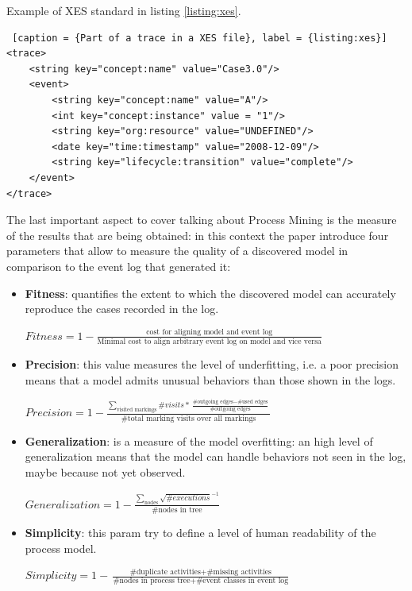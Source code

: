 Example of XES standard in listing \ref{listing:xes}.

\begin{lstlisting} [caption = {Part of a trace in a XES file}, label = {listing:xes}]
<trace>
    <string key="concept:name" value="Case3.0"/>
    <event>
        <string key="concept:name" value="A"/>
        <int key="concept:instance" value = "1"/>
        <string key="org:resource" value="UNDEFINED"/>
        <date key="time:timestamp" value="2008-12-09"/>
        <string key="lifecycle:transition" value="complete"/>
    </event>
</trace>
\end{lstlisting}


The last important aspect to cover talking about Process Mining is the measure of the results that are being obtained: in this 
context the paper \cite{DBLP:conf/ReplayQualityParameters} introduce four parameters that allow to measure the quality of a discovered 
model in comparison to the event log that generated it: 

\begin{itemize}
    \item \textbf{Fitness}: quantifies the extent to which the discovered model can accurately reproduce the cases recorded 
        in the log.

        \(Fitness = 1 - \frac{\textrm{cost for aligning model and event log}}{\textrm{Minimal cost to align arbitrary event log on model and vice versa}}\)

    \item \textbf{Precision}: this value measures the level of underfitting, i.e. a poor precision means that a model admits 
        unusual behaviors than those shown in the logs.

        \(Precision = 1 - \frac
            {\sum_{\textrm{visited markings}} \#visits * \frac{\textrm{\#outgoing edges} - \textrm{\#used edges}}{\textrm{\#outgoing edges}}}
            {\textrm{\#total marking visits over all markings}
        }\)
        
    \item \textbf{Generalization}: is a measure of the model overfitting: an high level of generalization means that the model 
        can handle behaviors not seen in the log, maybe because not yet observed.

        \(Generalization = 1 - \frac
        {\sum_{\textrm{nodes}} \sqrt{\#executions}^{-1}}
        {\textrm{\#nodes in tree}}
        \)
        
    \item \textbf{Simplicity}: this param try to define a level of human readability of the process model.
    
        \(Simplicity = 1 - \frac{\textrm{\#duplicate activities} + \textrm{\#missing activities}}{\textrm{\#nodes in process tree} + \textrm{\#event classes in event log}}\)
        
\end{itemize}

